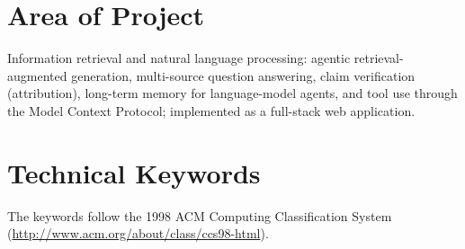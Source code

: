 \documentclass[oneside,a4paper,12pt]{report}
\begin{document}
\section{Area of Project}
Information retrieval and natural language processing: agentic retrieval-augmented generation, multi-source question answering, claim verification (attribution), long-term memory for language-model agents, and tool use through the Model Context Protocol; implemented as a full-stack web application.

\section{Technical Keywords}
The keywords follow the 1998 ACM Computing Classification System (\url{http://www.acm.org/about/class/ccs98-html}).
\end{document}
